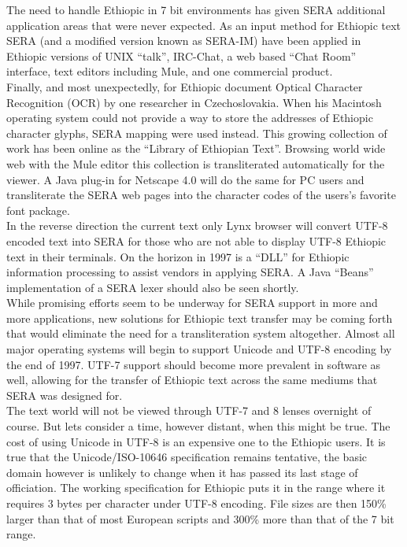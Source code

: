 The need to handle Ethiopic in 7 bit environments has given SERA additional
application areas that were never expected.   As an input method
for Ethiopic text SERA (and a modified version known as SERA-IM) have been
applied in Ethiopic versions of UNIX ``talk'', IRC-Chat, a web based ``Chat
Room'' interface, text editors including Mule, and one commercial product.\\

Finally, and most unexpectedly, for Ethiopic document Optical Character
Recognition (OCR) by one researcher in Czechoslovakia.  When his Macintosh
operating system could
not provide a way to store the addresses of Ethiopic character glyphs, SERA
mapping were used instead.  This growing collection of work has been online as
the ``Library of Ethiopian Text''.  Browsing world wide web with the Mule
editor this collection is transliterated automatically for the viewer. A
Java plug-in for Netscape 4.0 will do the same for PC users and transliterate
the SERA web pages into the character codes of the  users's  favorite font
package.\\

In the reverse direction the current text only Lynx browser will convert UTF-8
encoded text into SERA for those who are not able to display UTF-8 Ethiopic
text in their terminals.  On the horizon in 1997 is a ``DLL'' for Ethiopic
information processing to assist vendors in applying SERA.  A Java ``Beans''
implementation of a SERA lexer should also be seen shortly. \\


While promising efforts seem to be underway for SERA support in more and more 
applications, new solutions for Ethiopic text transfer may be coming forth that
would eliminate the need for a transliteration system altogether.  Almost all
major operating systems will begin to support Unicode and UTF-8 encoding by the
end of 1997.  UTF-7 support should become more prevalent in software as well,
allowing for the transfer of Ethiopic text across the same mediums that SERA
was designed for.\\

The text world will not be viewed through UTF-7 and 8 lenses overnight of 
course.  But lets consider a time, however distant, when this might be true.
The cost of using Unicode in UTF-8 is an expensive one to the Ethiopic users.
It is true that the Unicode/ISO-10646 specification remains tentative, the
basic domain however is unlikely to change when it has passed its last stage of
officiation.  The working specification for Ethiopic puts it in the range where
it requires 3 bytes per character under UTF-8 encoding.  File sizes are then
150\% larger than that of most European scripts and 300\% more than that of
the 7 bit range.\\

